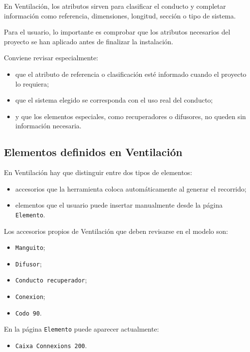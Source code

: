 \documentclass[12pt,a4paper]{article}
\begin{document}
En Ventilación, los atributos sirven para clasificar el conducto y completar información como referencia, dimensiones, longitud, sección o tipo de sistema.

Para el usuario, lo importante es comprobar que los atributos necesarios del proyecto se han aplicado antes de finalizar la instalación.

Conviene revisar especialmente:

\begin{itemize}
\item que el atributo de referencia o clasificación esté informado cuando el proyecto lo requiera;
\item que el sistema elegido se corresponda con el uso real del conducto;
\item y que los elementos especiales, como recuperadores o difusores, no queden sin información necesaria.
\end{itemize}

\subsection{Elementos definidos en Ventilación}

En Ventilación hay que distinguir entre dos tipos de elementos:

\begin{itemize}
\item accesorios que la herramienta coloca automáticamente al generar el recorrido;
\item elementos que el usuario puede insertar manualmente desde la página \texttt{Elemento}.
\end{itemize}

Los accesorios propios de Ventilación que deben revisarse en el modelo son:

\begin{itemize}
\item \texttt{Manguito};
\item \texttt{Difusor};
\item \texttt{Conducto recuperador};
\item \texttt{Conexion};
\item \texttt{Codo 90}.
\end{itemize}

En la página \texttt{Elemento} puede aparecer actualmente:

\begin{itemize}
\item \texttt{Caixa Connexions 200}.
\end{itemize}
\end{document}
